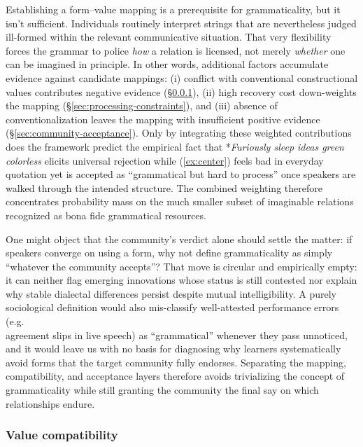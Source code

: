 \documentclass[12pt,letterpaper]{article}
\begin{document}
Establishing a form--value mapping is a prerequisite for grammaticality, but it isn't sufficient. Individuals routinely interpret strings that are nevertheless judged ill-formed within the relevant communicative situation. That very flexibility forces the grammar to police \emph{how} a relation is licensed, not merely \emph{whether} one can be imagined in principle. In other words, additional factors accumulate evidence against candidate mappings: (i) conflict with conventional constructional values contributes negative evidence (\S\ref{sec:value-compatibility}), (ii) high recovery cost down-weights the mapping (\S\ref{sec:processing-constraints}), and (iii) absence of conventionalization leaves the mapping with insufficient positive evidence (\S\ref{sec:community-acceptance}). Only by integrating these weighted contributions does the framework predict the empirical fact that *\textit{Furiously sleep ideas green colorless} elicits universal rejection while (\ref{ex:center}) feels bad in everyday quotation yet is accepted as \enquote{grammatical but hard to process} once speakers are walked through the intended structure. The combined weighting therefore concentrates probability mass on the much smaller subset of imaginable relations recognized as bona fide grammatical resources.

One might object that the community's verdict alone should settle the matter: if speakers converge on using a form, why not define grammaticality as simply \enquote{whatever the community accepts}? That move is circular and empirically empty: it can neither flag emerging innovations whose status is still contested nor explain why stable dialectal differences persist despite mutual intelligibility. A purely sociological definition would also mis-classify well-attested performance errors (e.g.\\ agreement slips in live speech) as \enquote{grammatical} whenever they pass unnoticed, and it would leave us with no basis for diagnosing why learners systematically avoid forms that the target community fully endorses. Separating the mapping, compatibility, and acceptance layers therefore avoids trivializing the concept of grammaticality while still granting the community the final say on which relationships endure.

\subsubsection{Value compatibility}\label{sec:value-compatibility}
\end{document}
